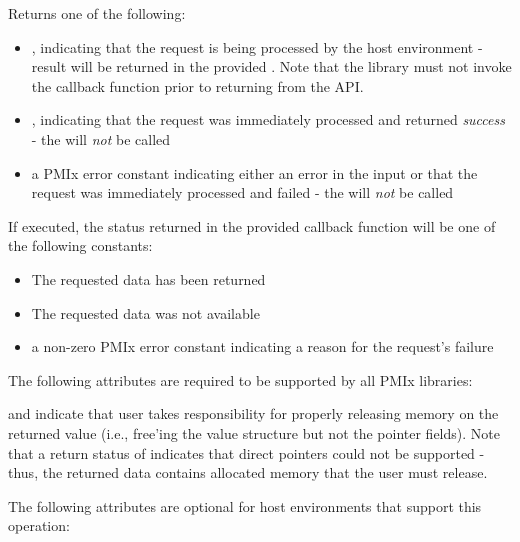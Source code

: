 Returns one of the following:

\begin{itemize}
    \item {}, indicating that the request is being processed by the host environment - result will be returned in the provided . Note that the library must not invoke the callback function prior to returning from the \ac{API}.
    \item {}, indicating that the request was immediately processed and returned \textit{success} - the  will \textit{not} be called
    \item a PMIx error constant indicating either an error in the input or that the request was immediately processed and failed - the  will \textit{not} be called
\end{itemize}

If executed, the status returned in the provided callback function will be one of the following constants:

\begin{itemize}
\item {} The requested data has been returned
\item {} The requested data was not available
\item a non-zero \ac{PMIx} error constant indicating a reason for the request's failure
\end{itemize}

\reqattrstart
The following attributes are required to be supported by all \ac{PMIx} libraries:

and indicate that user takes responsibility for properly releasing memory on the returned value (i.e., free'ing the value structure but not the pointer fields). Note that a return status of  indicates that direct pointers could not be supported - thus, the returned data contains allocated memory that the user must release.
\pasteAttributeItemEnd

\reqattrend

\optattrstart
The following attributes are optional for host environments that support this operation:

